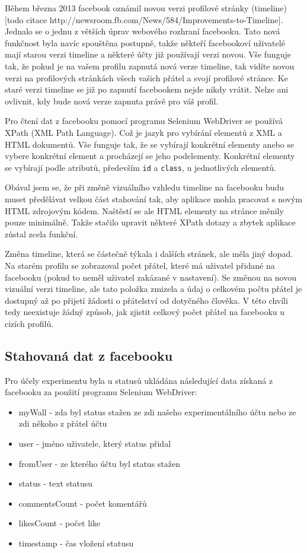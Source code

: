 \documentclass[thesis=M,czech]{FITthesis}[2013/05/10]
\begin{document}
Během března 2013 facebook oznámil novou verzi profilové stránky (timeline) [todo citace http://newsroom.fb.com/News/584/Improvements-to-Timeline]. Jednalo se o jednu z větších úprav webového rozhraní facebooku. Tato nová funkčnost byla navíc spouštěna postupně, takže někteří facebookoví uživatelé mají starou verzi timeline a některé účty již používají verzi novou. Vše funguje tak, že pokud je na vašem profilu zapnutá nová verze timeline, tak vidíte novou verzi na profilových stránkách všech vašich přátel a svojí profilové stránce. Ke staré verzi timeline se již po zapnutí facebookem nejde nikdy vrátit. Nelze ani ovlivnit, kdy bude nová verze zapnuta právě pro váš profil.

Pro čtení dat z facebooku pomocí programu Selenium WebDriver se používá XPath (XML Path Language). Což je jazyk pro vybírání elementů z XML a HTML dokumentů. Vše funguje tak, že se vybírají konkrétní elementy anebo se vybere konkrétní element a procházejí se jeho podelementy. Konkrétní elementy se vybírají podle atributů, především \verb|id| a \verb|class|, u jednotlivých elementů.

Obával jsem se, že při změně vizuálního vzhledu timeline na facebooku budu muset předělávat velkou část stahování tak, aby aplikace mohla pracovat s novým HTML zdrojovým kódem. Naštěstí se ale HTML elementy na stránce měnily pouze minimálně. Takže stačilo upravit některé XPath dotazy a zbytek aplikace zůstal zcela funkční.

Změna timeline, která se částečně týkala i dalších stránek, ale měla jiný dopad. Na starém profilu se zobrazoval počet přátel, které má uživatel přidané na facebooku (pokud to neměl uživatel zakázané v nastavení). Se změnou na novou vizuální verzi timeline, ale tato položka zmizela a údaj o celkovém počtu přátel je dostupný až po přijetí žádosti o přátelství od dotyčného člověka. V této chvíli tedy neexistuje žádný způsob, jak zjistit celkový počet přátel na facebooku u cizích profilů. 

\subsection{Stahovaná dat z facebooku}

Pro účely experimentu byla u statusů ukládána následující data získaná z facebooku za použití programu Selenium WebDriver:

\begin{itemize}
  \item myWall - zda byl status stažen ze zdi našeho experimentálního účtu nebo ze zdi někoho z přátel účtu
  \item user - jméno uživatele, který status přidal
  \item fromUser - ze kterého účtu byl status stažen  
  \item status - text statusu
  \item commentsCount - počet komentářů
  \item likesCount - počet like
  \item timestamp - čas vložení statusu
\end{itemize}
\end{document}
